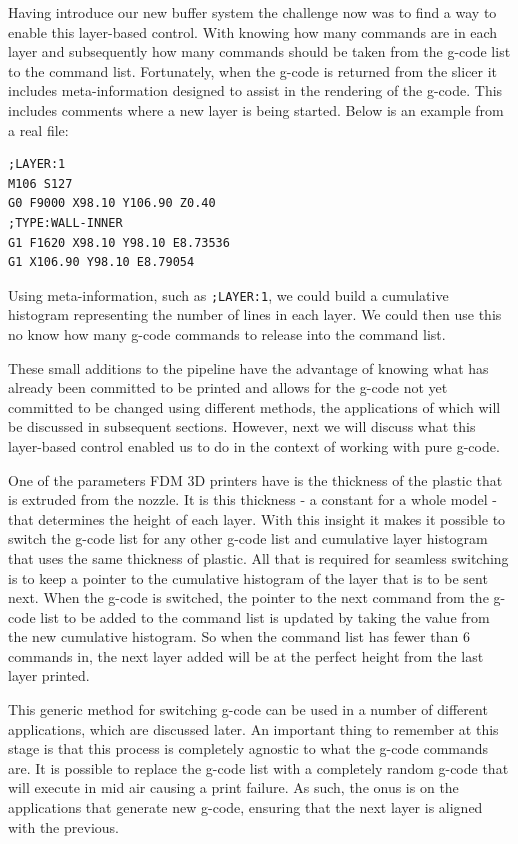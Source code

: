 \documentclass[11pt]{report} %
\begin{document}
Having introduce our new buffer system the challenge now was to find a way to enable this layer-based control. With knowing how many commands are in each layer and subsequently how many commands should be taken from the g-code list to the command list. Fortunately, when the g-code is returned from the slicer it includes meta-information designed to assist in the rendering of the g-code. This includes comments where a new layer is being started. Below is an example from a real file:
\begin{verbatim}
;LAYER:1
M106 S127
G0 F9000 X98.10 Y106.90 Z0.40
;TYPE:WALL-INNER
G1 F1620 X98.10 Y98.10 E8.73536
G1 X106.90 Y98.10 E8.79054
\end{verbatim}

Using meta-information, such as \verb|;LAYER:1|,  we could build a cumulative histogram representing the number of lines in each layer. We could then use this no know how many g-code commands to release into the command list. 

These small additions to the pipeline have the advantage of knowing what has already been committed to be printed and allows for the g-code not yet committed to be changed using different methods, the applications of which will be discussed in subsequent sections. However, next we will discuss what this layer-based control enabled us to do in the context of working with pure g-code. 

One of the parameters FDM 3D printers have is the thickness of the plastic that is extruded from the nozzle. It is this thickness - a constant for a whole model - that determines the height of each layer. With this insight it makes it possible to switch the g-code list for any other g-code list and cumulative layer histogram that uses the same thickness of plastic. All that is required for seamless switching is to keep a pointer to the cumulative histogram of the layer that is to be sent next. When the g-code is switched, the pointer to the next command from the g-code list to be added to the command list is updated by taking the value from the new cumulative histogram. So when the command list has fewer than 6 commands in, the next layer added will be at the perfect height from the last layer printed. 

This generic method for switching g-code can be used in a number of different applications, which are discussed later. An important thing to remember at this stage is that this process is completely agnostic to what the g-code commands are. It is possible to replace the g-code list with a completely random g-code that will execute in mid air causing a print failure. As such, the onus is on the applications that generate new g-code, ensuring that the next layer is aligned with the previous.
\end{document}
